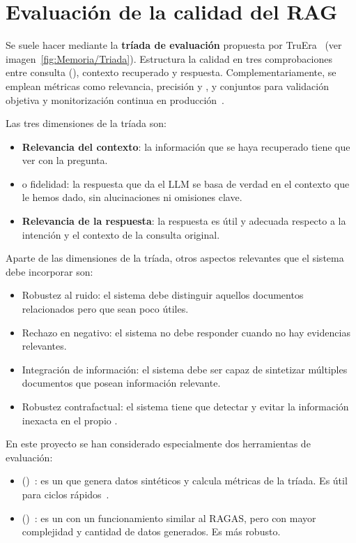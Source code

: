 \section{Evaluación de la calidad del RAG}
Se suele hacer mediante la \textbf{tríada de evaluación} propuesta por TruEra~\cite{RAG:triad} (ver imagen~\ref{fig:Memoria/Triada}). Estructura la calidad en tres comprobaciones entre consulta (), contexto recuperado y respuesta. Complementariamente, se emplean métricas como relevancia, precisión y , y conjuntos  para validación objetiva y monitorización continua en producción~\cite{book:RAG_SimpleGuide}.


Las tres dimensiones de la tríada son:
\begin{itemize}
\tightlist
	\item \textbf{Relevancia del contexto}: la información que se haya recuperado tiene que ver con la pregunta.
	\item \textbf{} o fidelidad: la respuesta que da el LLM se basa de verdad en el contexto que le hemos dado, sin alucinaciones ni omisiones clave.
	\item \textbf{Relevancia de la respuesta}: la respuesta es útil y adecuada respecto a la intención y el contexto de la consulta original.
\end{itemize}

Aparte de las dimensiones de la tríada, otros aspectos relevantes que el sistema debe incorporar son:
\begin{itemize}
\tightlist
	\item Robustez al ruido: el sistema debe distinguir aquellos documentos relacionados pero que sean poco útiles.
	\item Rechazo en negativo: el sistema no debe responder cuando no hay evidencias relevantes.
	\item Integración de información: el sistema debe ser capaz de sintetizar múltiples documentos que posean información relevante.
	\item Robustez contrafactual: el sistema tiene que detectar y evitar la información inexacta en el propio .
\end{itemize}

En este proyecto se han considerado especialmente dos herramientas de evaluación:
\begin{itemize}
\tightlist
	\item \textbf{} ()~\cite{paper:ragas}: es un  que genera datos sintéticos y calcula métricas de la tríada. Es útil para ciclos rápidos~\cite{ragas:docs}. 
	\item \textbf{} ()~\cite{saadfalcon2024ares}: es un  con un funcionamiento similar al RAGAS, pero con mayor complejidad y cantidad de datos generados. Es más robusto.
\end{itemize}
